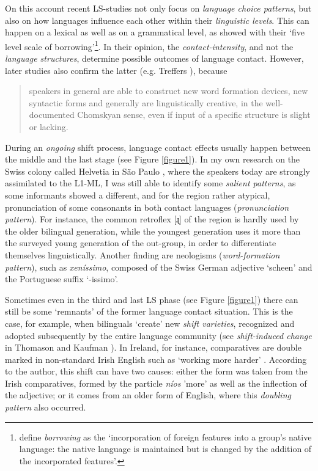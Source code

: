 \documentclass[output=paper,
modfonts
]{langscibook}
\begin{document}
On this account recent LS-studies not only focus on \emph{language choice patterns}, but also on how languages influence each other within their \emph{linguistic levels}. This can happen on a lexical as well as on a grammatical level, as \cite[35]{thomasonkaufman1988} showed with their ‘five level scale of borrowing'\footnote{\cite[37]{thomasonkaufman1988} define \emph{borrowing} as the ‘incorporation of foreign features into a group's native language: the native language is maintained but is changed by the addition of the incorporated features’.}. In their opinion, the \emph{contact-intensity}, and not the \emph{language structures}, determine possible outcomes of language contact. However, later studies also confirm the latter (e.g. Treffers \citeyear{Treffers1999}), because 

\begin{quote}
speakers in general are able to construct new word formation devices, new syntactic forms and generally are linguistically creative, in the well-documented Chomskyan sense, even if input of a specific structure is slight or lacking. \parencite[591]{Gal2008}
\end{quote}

During an \emph{ongoing} shift process, language contact effects usually happen between the middle and the last stage (see Figure \ref{figure1}). In my own research on the Swiss colony called Helvetia in São Paulo \parencite{Karnopp}, where the speakers today are strongly assimilated to the L1-ML, I was still able to identify some \emph{salient patterns}, as some informants showed a different, and for the region rather atypical, pronunciation of  some consonants in both contact languages (\emph{pronunciation pattern}). For instance, the common retroflex [ɻ] of the region is hardly used by the older bilingual generation, while the youngest generation uses it more than the surveyed young generation of the out-group, in order to differentiate themselves linguistically. Another finding are neologisms (\emph{word-formation pattern}), such as \emph{xeníssimo}, composed of the Swiss German adjective ‘scheen' and the Portuguese suffix ‘-issimo'. 

Sometimes even in the third and last LS phase (see Figure \ref{figure1}) there can still be some ‘remnants' of the former language contact situation. This is the case, for example, when bilinguals ‘create' new \emph{shift varieties}, recognized and adopted subsequently by the entire language community (see \emph{shift-induced change} in Thomason and Kaufman \citeyear[38]{thomasonkaufman1988}). In Ireland, for instance, comparatives are double marked in non-standard Irish English such as ‘working more harder’ \parencite[153]{Hickey2010}. According to the author, this shift can have two causes: either the form was taken from the Irish comparatives, formed by the particle \emph{níos} 'more' as well as the inflection of the adjective; or it comes from an older form of English, where this \emph{doubling pattern} also occurred.
\end{document}
